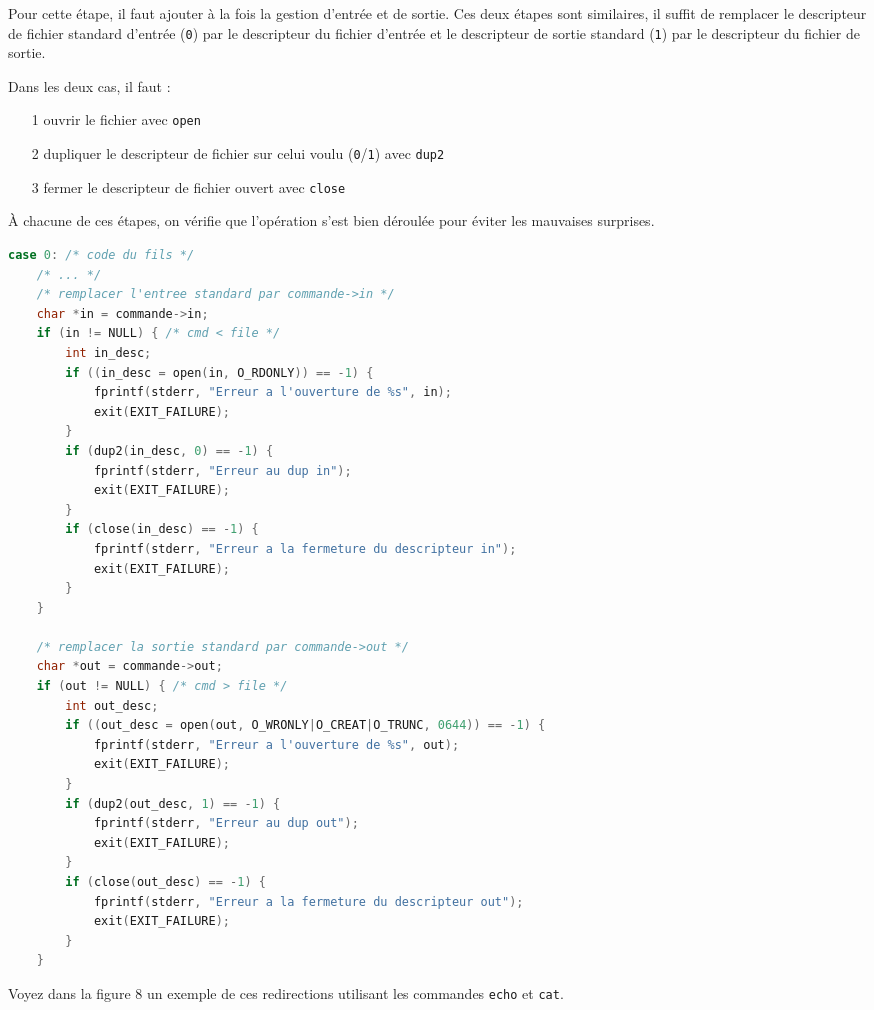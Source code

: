 \documentclass{article}
\begin{document}
Pour cette étape, il faut ajouter à la fois la gestion d'entrée et de sortie. Ces deux étapes sont similaires, il suffit de remplacer le descripteur de fichier standard d'entrée (\texttt{0}) par le descripteur du fichier d'entrée et le descripteur de sortie standard (\texttt{1}) par le descripteur du fichier de sortie.

Dans les deux cas, il faut :
\begin{itemize}
    \item[1] ouvrir le fichier avec \texttt{open}
    \item[2] dupliquer le descripteur de fichier sur celui voulu (\texttt{0}/\texttt{1}) avec \texttt{dup2}
    \item[3] fermer le descripteur de fichier ouvert avec \texttt{close}
\end{itemize}
À chacune de ces étapes, on vérifie que l'opération s'est bien déroulée pour éviter les mauvaises surprises.

\begin{lstlisting}[language=C, caption=gestion des redirections]
case 0: /* code du fils */
    /* ... */
    /* remplacer l'entree standard par commande->in */
    char *in = commande->in;
    if (in != NULL) { /* cmd < file */
        int in_desc;
        if ((in_desc = open(in, O_RDONLY)) == -1) {
            fprintf(stderr, "Erreur a l'ouverture de %s", in);
            exit(EXIT_FAILURE);
        }
        if (dup2(in_desc, 0) == -1) {
            fprintf(stderr, "Erreur au dup in");
            exit(EXIT_FAILURE);
        }
        if (close(in_desc) == -1) {
            fprintf(stderr, "Erreur a la fermeture du descripteur in");
            exit(EXIT_FAILURE);
        }
    }

    /* remplacer la sortie standard par commande->out */
    char *out = commande->out;
    if (out != NULL) { /* cmd > file */
        int out_desc;
        if ((out_desc = open(out, O_WRONLY|O_CREAT|O_TRUNC, 0644)) == -1) {
            fprintf(stderr, "Erreur a l'ouverture de %s", out);
            exit(EXIT_FAILURE);
        }
        if (dup2(out_desc, 1) == -1) {
            fprintf(stderr, "Erreur au dup out");
            exit(EXIT_FAILURE);
        }
        if (close(out_desc) == -1) {
            fprintf(stderr, "Erreur a la fermeture du descripteur out");
            exit(EXIT_FAILURE);
        }
    }
\end{lstlisting}

Voyez dans la figure 8 un exemple de ces redirections utilisant les commandes \texttt{echo} et \texttt{cat}.
\end{document}

